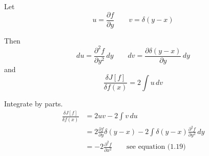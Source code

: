 Let
\begin{equation*}
u=\frac{\partial f}{\partial y}\qquad v=\delta(y-x)
\end{equation*}

Then
\begin{equation*}
du=\frac{\partial^2f}{\partial y^2}\,dy
\qquad
dv=\frac{\partial\delta(y-x)}{\partial y}\,dy
\end{equation*}
and
\begin{equation*}
\frac{\delta J[f]}{\delta f(x)}=2\int u\,dv
\end{equation*}

Integrate by parts.
\begin{align*}
\frac{\delta J[f]}{\delta f(x)}
&=2uv-2\int v\,du
\\
&=2\frac{\partial f}{\partial y}\delta(y-x)-2\int\delta(y-x)\frac{\partial^2f}{\partial y^2}\,dy
\\
&=-2\frac{\partial^2f}{\partial x^2}
\qquad\text{see equation (1.19)}
\end{align*}


